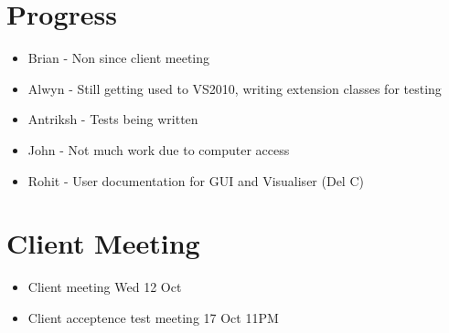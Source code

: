 
\date{10 October 2011}
\absent{-}
\apologies{-}



\section{Progress}
\begin{itemize}
\item Brian - Non since client meeting
\item Alwyn - Still getting used to VS2010, writing extension classes for testing
\item Antriksh - Tests being written
\item John - Not much work due to computer access
\item Rohit - User documentation for GUI and Visualiser (Del C)
\end{itemize}

\section{Client Meeting}
\begin{itemize}
\item Client meeting Wed 12 Oct
\item Client acceptence test meeting 17 Oct 11PM
\end{itemize}




